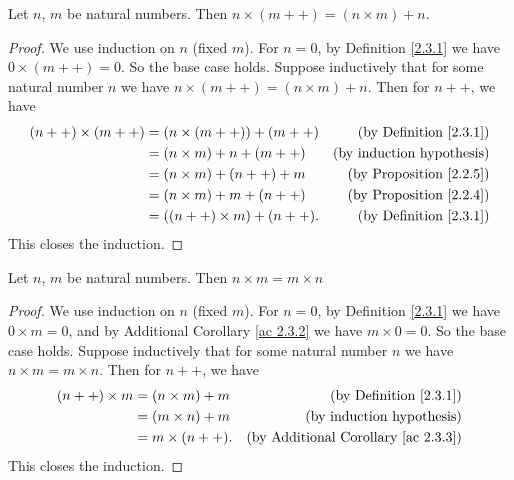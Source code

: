 \begin{additional corollary}\label{ac 2.3.3}
Let \(n\), \(m\) be natural numbers.
Then \(n \times (m++) = (n \times m) + n\).
\end{additional corollary}

\begin{proof}
    We use induction on \(n\) (fixed \(m\)).
    For \(n = 0\), by Definition \ref{2.3.1} we have \(0 \times (m++) = 0\).
    So the base case holds.
    Suppose inductively that for some natural number \(n\) we have \(n \times (m++) = (n \times m) + n\).
    Then for \(n++\), we have
    \begin{align*}
        (n++) \times (m++)
         & = (n \times (m++)) + (m++)  & \text{(by Definition \ref{2.3.1})}  \\
         & = (n \times m) + n + (m++)  & \text{(by induction hypothesis)}    \\
         & = (n \times m) + (n++) + m  & \text{(by Proposition \ref{2.2.5})} \\
         & = (n \times m) + m + (n++)  & \text{(by Proposition \ref{2.2.4})} \\
         & = ((n++) \times m) + (n++). & \text{(by Definition \ref{2.3.1})}
    \end{align*}
    This closes the induction.
\end{proof}

\begin{lemma}\label{2.3.2}
    Let \(n\), \(m\) be natural numbers.
    Then \(n \times m = m \times n\)
\end{lemma}

\begin{proof}
    We use induction on \(n\) (fixed \(m\)).
    For \(n = 0\), by Definition \ref{2.3.1} we have \(0 \times m = 0\), and by Additional Corollary \ref{ac 2.3.2} we have \(m \times 0 = 0\).
    So the base case holds.
    Suppose inductively that for some natural number \(n\) we have \(n \times m = m \times n\).
    Then for \(n++\), we have
    \begin{align*}
        (n++) \times m & = (n \times m) + m & \text{(by Definition \ref{2.3.1})}              \\
                       & = (m \times n) + m & \text{(by induction hypothesis)}                \\
                       & = m \times (n++).  & \text{(by Additional Corollary \ref{ac 2.3.3})}
    \end{align*}
    This closes the induction.
\end{proof}

